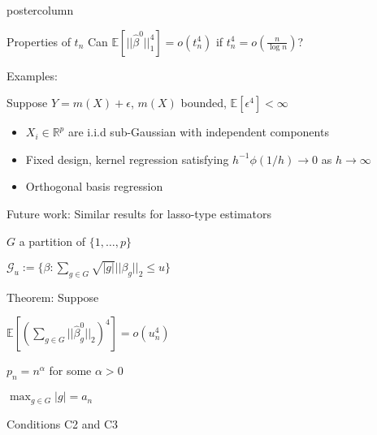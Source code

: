 \documentclass[final]{beamer}
\newcommand{\E}{\mathbb{E}}
\newcommand{\R}{\mathbb{R}}
\newcommand{\alg}[1]{\textcolor{greenstruct}{#1}}
\newcommand{\alb}[1]{\textcolor{bluemain}{#1}}
\newcommand{\ols}{\hat\beta^0}
\newcommand{\GL}{\mathcal{G}}
\renewcommand{\hat}{\widehat}
\newcommand{\vsp}{\vspace{.2in}}
\newcommand{\bluebox}{\hspace{1em}\alb{\raisebox{.25ex}{\rule{1ex}{1ex}}}\hspace{1ex}}
\begin{document}
\begin{frame}
\begin{columns}
\begin{column}{.49\textwidth}
\begin{beamercolorbox}[center,wd=\textwidth]{postercolumn}
\begin{minipage}[T]{.96\textwidth}
{\begin{block}{Properties of $t_n$}
              \vsp		
              Can $  \mathbb{E}\left[||\ols||_1^{4}\right] = o(t_n^4)$ if 
              $t^4_n = o\left(\frac{n}{\log n} \right)$?
              
              \vsp
              {\sc \alg{Examples:}} 
              
              Suppose $Y=m(X) + \epsilon$, $m(X)$ bounded, $\E[\epsilon^4]<\infty$
              \vsp
              \begin{itemize}
              \item[]\bluebox $X_i \in \R^p$ are i.i.d sub-Gaussian
                with independent components
              
              \vsp
              \item[]\bluebox Fixed design, kernel regression satisfying
                $h^{-1} \phi(1/h)\rightarrow
                0$ as $h\rightarrow\infty$

                \vsp
              \item[]\bluebox Orthogonal basis regression
            \end{itemize}
            \vsp
            \end{block}
            \vfill
            
            Future work: Similar results for lasso-type estimators
            \vsp
            
            \bluebox $G$ a partition of $\{1,\ldots,p\}$
            \vsp
            
            \bluebox $\GL_u := \{ \beta: \sum_{g\in G} \sqrt{|g|}||\beta_g||_2 \leq
            u\}$
            \vsp
            
            {\sc \alb{Theorem:}}  Suppose
            \vsp
            
            
            \bluebox   $\E\left[\left(\sum_{g\in G}
                ||\ols_g||_2\right)^4\right] = o(u_n^4)$
            
            \bluebox  $p_n=n^\alpha$ for   some $\alpha>0$
            
            \bluebox $\max_{g\in G} |g|=a_n$
            
            \bluebox Conditions \alb{C2} and \alb{C3}
            
}
\end{minipage}
\end{beamercolorbox}
\end{column}
\end{columns}
\end{frame}
\end{document}
